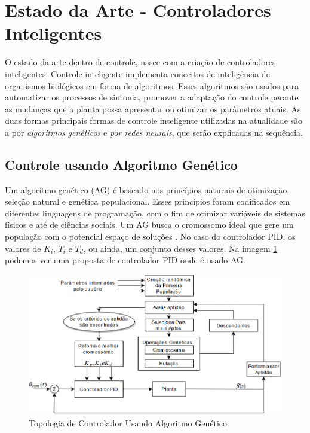 \section{Estado da Arte - Controladores Inteligentes}

O estado da arte dentro de controle, nasce com a criação de controladores inteligentes. Controle inteligente implementa conceitos de inteligência de organismos biológicos em forma de algoritmos. Esses algoritmos são usados para automatizar os processos de sintonia, promover a adaptação do controle perante as mudanças que a planta possa apresentar ou otimizar os parâmetros atuais. As duas formas principais formas de controle inteligente utilizadas na atualidade são a por \textit{algoritmos genéticos} e \textit{por redes neurais}, que serão explicadas na sequência.


\subsection{Controle usando Algoritmo Genético}  %

Um algoritmo genético (AG) é baseado nos princípios naturais de otimização, seleção natural e genética populacional. Esses princípios foram codificados em diferentes linguagens de programação, com o fim de otimizar variáveis de sistemas físicos e até de ciências sociais. Um AG busca o cromossomo ideal que gere um população com o potencial espaço de soluções \cite{Unal2013}. No caso do controlador PID, os valores de $K_i$, $T_i$ e $T_d$, ou ainda, um conjunto desses valores. Na imagem \ref{fig:pid_genetic_unal_p45} podemos ver uma proposta de controlador PID onde é usado AG. 

\begin{figure}[H]
  \caption{Topologia de Controlador Usando Algoritmo Genético}
  \begin{center}
      \includegraphics[scale=0.65]{img/pid_genetic_unal_p45}
  \end{center}
  \label{fig:pid_genetic_unal_p45}
\end{figure}

